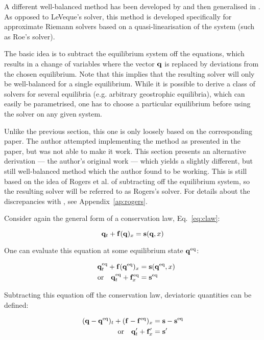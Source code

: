 A different well-balanced method has been developed by \citet{rogers2001adaptive} and then generalised in \cite{rogers2003mathematical}. As opposed to LeVeque's solver, this method is developed specifically for approximate Riemann solvers based on a quasi-linearisation of the system (such as Roe's solver).

The basic idea is to subtract the equilibrium system off the equations, which results in a change of variables where the vector $\vb q$ is replaced by deviations from the chosen equilibrium. Note that this implies that the resulting solver will only be well-balanced for a single equilibrium. While it is possible to derive a class of solvers for several equilibria (e.g. arbitrary geostrophic equilibria), which can easily be parametrised, one has to choose a particular equilibrium before using the solver on any given system.

Unlike the previous section, this one is only loosely based on the corresponding paper. The author attempted implementing the method as presented in the paper, but was not able to make it work. This section presents an alternative derivation --- the author's original work --- which yields a slightly different, but still well-balanced method which the author found to be working. This is still based on the idea of Rogers et al. of subtracting off the equilibrium system, so the resulting solver will be referred to as Rogers's solver. For details about the discrepancies with \cite{rogers2003mathematical}, see Appendix~\ref{ap:rogers}.

Consider again the general form of a conservation law, Eq.~\ref{eq:claw}:

$$
  \vb q_t + \vb f(\vb q)_x = \vb s(\vb q, x)
$$

One can evaluate this equation at some equilibrium state $\vb q^\mathrm{eq}$:

\begin{align}
  \eq{\vb q}_t + \vb f(\eq{\vb q})_x &= \vb s(\eq{\vb q}, x) \\
  \qq{or} \eq{\vb q}_t + \eq{\vb f}_x &= \eq{\vb s}
\end{align}

Subtracting this equation off the conservation law, deviatoric quantities can be defined:

\begin{align}
  (\vb q - \eq{\vb q})_t + (\vb f - \eq{\vb f})_x &= \vb s - \eq{\vb s} \\
  \qq{or} \vb q'_t + \vb f'_x &= \vb s'
\end{align}

